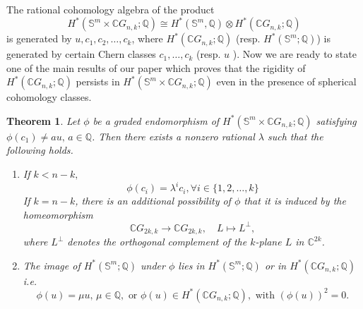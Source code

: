 \documentclass{amsart}
\newtheorem{theorem}{Theorem}[section]
\begin{document}
	The rational cohomology algebra of the product
	\[
	H^*(\mathbb S^m \times \mathbb CG_{n,k};\mathbb Q)\cong H^*(\mathbb S^m,\mathbb Q)\otimes H^*(\mathbb CG_{n,k};\mathbb Q)
	\]
	is generated by $u,c_1,c_2,\dots,c_k$, where $H^*(\mathbb{C}G_{n,k};\mathbb{Q})$ (resp. $H^*(\mathbb S^m;\mathbb Q)$) is generated by certain Chern classes $c_1, \dots, c_k$ (resp. $u$%
). Now we %
are ready to state one of the main results of our paper which proves that the rigidity of $H^*(\mathbb CG_{n,k};\mathbb Q)$ persists in $H^*(\mathbb S^m \times \mathbb CG_{n,k};\mathbb Q)$ even in the presence of spherical cohomology classes.
	\begin{theorem}
		Let $\phi$ be a graded endomorphism of 
		$H^*(\mathbb S^{m}\times\mathbb C G_{n,k};\mathbb Q)$ 
		satisfying $\phi(c_1)\neq a u, \, a\in\mathbb Q$.  
		Then there exists a nonzero rational $\lambda$ such that the following %
holds.
		\begin{enumerate}\label{result main}
			\item If $k < n - k,$ 
			$$ \phi(c_i) = \lambda^i c_i, \forall i \in \{1,2,\dots,k\}$$
			If %
$k = n - k$, there is an additional possibility of $\phi$ that it is induced by the homeomorphism 
			\[
			\mathbb{C}G_{2k,k} \longrightarrow \mathbb{C}G_{2k,k}, 
			\quad L \longmapsto L^{\perp},
			\]
			where $L^{\perp}$ denotes the orthogonal complement of the $k$-plane $L$ in %
$\mathbb{C}^{2k}$.
			
			\item 
			The image of $H^*(\mathbb{S}^m;\mathbb{Q})$ under $\phi$ lies in 
			$H^*(\mathbb{S}^m;\mathbb{Q})$ or in $H^*(\mathbb{C}G_{n,k};\mathbb{Q})$ i.e. $$\phi(u) = \mu u,\, \mu \in \mathbb{Q}, \text{ or } \phi(u) \in H^*(\mathbb{C}G_{n,k};\mathbb{Q}), \text{ with } (\phi(u))^2 =0.$$
			
		\end{enumerate}
	\end{theorem}
\end{document}
